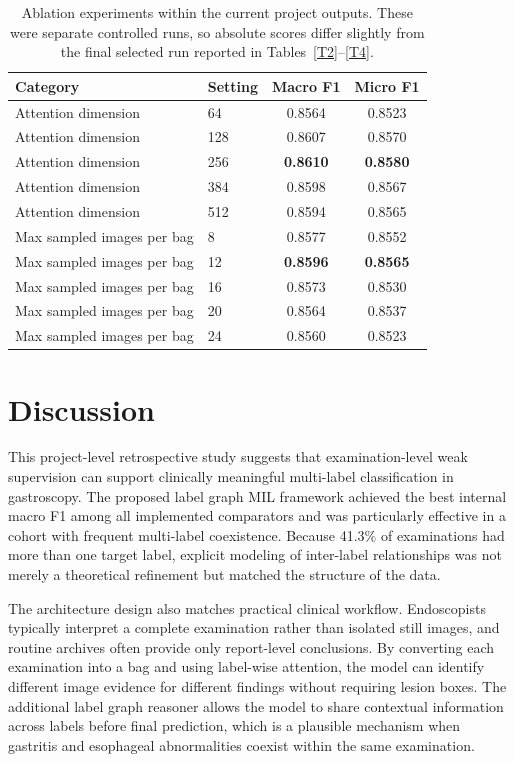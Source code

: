 \documentclass[Afour,sagev,times]{sagej}
\begin{document}
\begin{table}[h]
\small\sf\centering
\caption{Ablation experiments within the current project outputs. These were separate controlled runs, so absolute scores differ slightly from the final selected run reported in Tables~\ref{T2}--\ref{T4}.\label{T5}}
\begin{tabular}{llcc}
\toprule
Category & Setting & Macro F1 & Micro F1 \\
\midrule
Attention dimension & 64 & 0.8564 & 0.8523 \\
Attention dimension & 128 & 0.8607 & 0.8570 \\
Attention dimension & 256 & \textbf{0.8610} & \textbf{0.8580} \\
Attention dimension & 384 & 0.8598 & 0.8567 \\
Attention dimension & 512 & 0.8594 & 0.8565 \\
\midrule
Max sampled images per bag & 8 & 0.8577 & 0.8552 \\
Max sampled images per bag & 12 & \textbf{0.8596} & \textbf{0.8565} \\
Max sampled images per bag & 16 & 0.8573 & 0.8530 \\
Max sampled images per bag & 20 & 0.8564 & 0.8537 \\
Max sampled images per bag & 24 & 0.8560 & 0.8523 \\
\bottomrule
\end{tabular}
\end{table}

\section{Discussion}
This project-level retrospective study suggests that examination-level weak supervision can support clinically meaningful multi-label classification in gastroscopy. The proposed label graph MIL framework achieved the best internal macro F1 among all implemented comparators and was particularly effective in a cohort with frequent multi-label coexistence. Because 41.3\% of examinations had more than one target label, explicit modeling of inter-label relationships was not merely a theoretical refinement but matched the structure of the data.

The architecture design also matches practical clinical workflow. Endoscopists typically interpret a complete examination rather than isolated still images, and routine archives often provide only report-level conclusions. By converting each examination into a bag and using label-wise attention, the model can identify different image evidence for different findings without requiring lesion boxes. The additional label graph reasoner allows the model to share contextual information across labels before final prediction, which is a plausible mechanism when gastritis and esophageal abnormalities coexist within the same examination.
\end{document}
